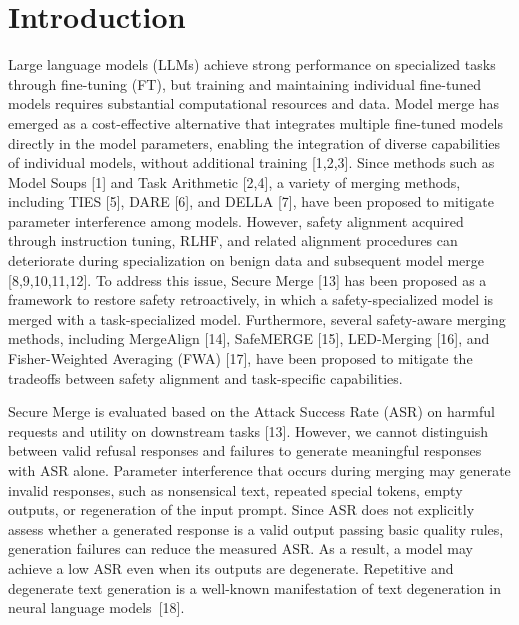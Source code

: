 \documentclass{article}
\begin{document}
\section{Introduction}
Large language models (LLMs) achieve strong performance on specialized tasks through fine-tuning (FT), but training and maintaining individual fine-tuned models requires substantial computational resources and data. Model merge has emerged as a cost-effective alternative that integrates multiple fine-tuned models directly in the model parameters, enabling the integration of diverse capabilities of individual models, without additional training [1,2,3]. Since methods such as Model Soups [1] and Task Arithmetic [2,4], a variety of merging methods, including TIES [5], DARE [6], and DELLA [7], have been proposed to mitigate parameter interference among models. However, safety alignment acquired through instruction tuning, RLHF, and related alignment procedures can deteriorate during specialization on benign data and subsequent model merge [8,9,10,11,12]. To address this issue, Secure Merge [13] has been proposed as a framework to restore safety retroactively, in which a safety-specialized model is merged with a task-specialized model. Furthermore, several safety-aware merging methods, including MergeAlign [14], SafeMERGE [15], LED-Merging [16], and Fisher-Weighted Averaging (FWA) [17], have been proposed to mitigate the tradeoffs between safety alignment and task-specific capabilities.

Secure Merge is evaluated based on the Attack Success Rate (ASR) on harmful requests and utility on downstream tasks [13]. However, we cannot distinguish between valid refusal responses and failures to generate meaningful responses with ASR alone. Parameter interference that occurs during merging may generate invalid responses, such as nonsensical text, repeated special tokens, empty outputs, or regeneration of the input prompt.
Since ASR does not explicitly assess whether a generated response is a valid output passing basic quality rules, generation failures can reduce the measured ASR. As a result, a model may achieve a low ASR even when its outputs are degenerate. Repetitive and degenerate text generation is a well-known manifestation of text degeneration in neural language models~[18].
\end{document}
